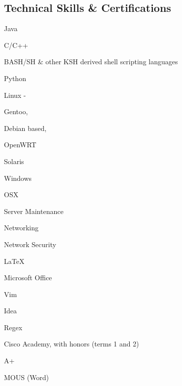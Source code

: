 \documentclass[a4paper,margin,line]{resume}
\begin{document}
\begin{resume}
\section{\mysidestyle Technical Skills \& Certifications}
	\begin{compactdesc}
		\item[Languages] \begin{inparaenum} { \small
			\item Java
			\item C/C++
			\item BASH/SH \& other KSH derived shell scripting languages
			\item Python
		} \end{inparaenum}
		\item[Operating Systems] \begin{inparaenum} { \small
			\item Linux -
			\begin{inparablank}
				\item Gentoo,
				\item Debian based,
				\item OpenWRT
			\end{inparablank}
			\item Solaris
			\item Windows
			\item OSX
		} \end{inparaenum}
		\item[Hardware] \begin{inparaenum} { \small
			\item Server Maintenance
			\item Networking
			\item Network Security
		} \end{inparaenum}
		\item[Tools] \begin{inparaenum} { \small
			\item \LaTeX
			\item Microsoft Office
			\item Vim
			\item Idea
			\item Regex
		} \end{inparaenum}
		\item[Certifications] \begin{inparaenum} { \small
			\item Cisco Academy, with honors (terms 1 and 2)
			\item A+
			\item MOUS (Word)
		} \end{inparaenum}
	\end{compactdesc}


\end{resume}
\end{document}
